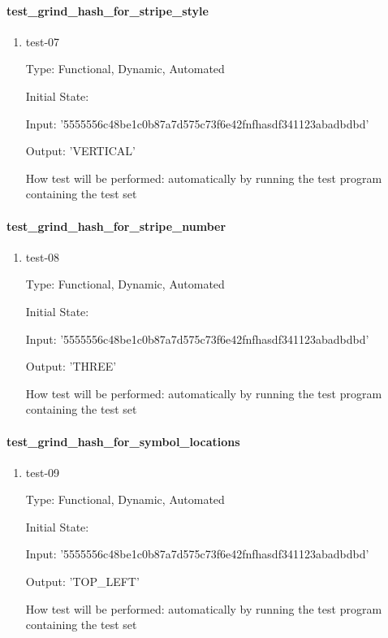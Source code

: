 \documentclass[12pt, titlepage]{article}
\begin{document}
\paragraph{test\_grind\_hash\_for\_stripe\_style}

\begin{enumerate}

\item{test-07\\}

Type: Functional, Dynamic, Automated

Initial State:

Input: '5555556c48be1c0b87a7d575c73f6e42fnfhasdf341123abadbdbd'

Output: 'VERTICAL'

How test will be performed: automatically by running the test program
containing the test set

\end{enumerate}

\paragraph{test\_grind\_hash\_for\_stripe\_number}

\begin{enumerate}

\item{test-08\\}

Type: Functional, Dynamic, Automated

Initial State:

Input: '5555556c48be1c0b87a7d575c73f6e42fnfhasdf341123abadbdbd'

Output: 'THREE'

How test will be performed: automatically by running the test program
containing the test set

\end{enumerate}

\paragraph{test\_grind\_hash\_for\_symbol\_locations}

\begin{enumerate}

\item{test-09\\}

Type: Functional, Dynamic, Automated

Initial State:

Input: '5555556c48be1c0b87a7d575c73f6e42fnfhasdf341123abadbdbd'

Output: 'TOP\_LEFT'

How test will be performed: automatically by running the test program
containing the test set

\end{enumerate}
\end{document}
